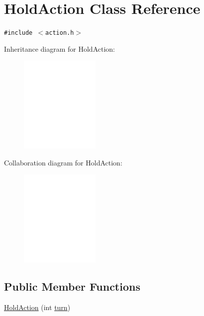\hypertarget{classHoldAction}{
\section{HoldAction Class Reference}
\label{classHoldAction}
}
{\tt \#include $<$action.h$>$}

Inheritance diagram for HoldAction:\nopagebreak
\begin{figure}[H]
\begin{center}
\leavevmode
\includegraphics[width=108pt]{classHoldAction__inherit__graph}
\end{center}
\end{figure}
Collaboration diagram for HoldAction:\nopagebreak
\begin{figure}[H]
\begin{center}
\leavevmode
\includegraphics[width=108pt]{classHoldAction__coll__graph}
\end{center}
\end{figure}
\subsection*{Public Member Functions}
\begin{CompactItemize}
\item 
\hyperlink{classHoldAction_4af274044f62732dc5ffbb60d021e8ec}{HoldAction} (int \hyperlink{classAction_51e5d56a6aa4a037e90df19587a225c7}{turn})
\end{CompactItemize}


